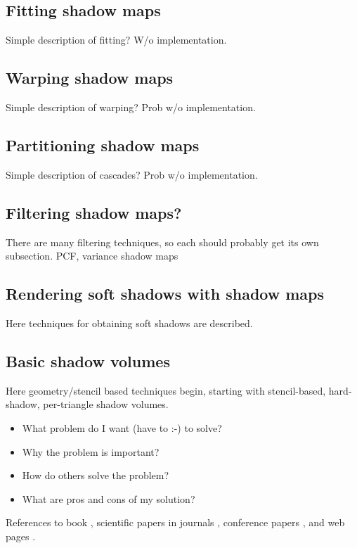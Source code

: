 \subsection{Fitting shadow maps}
Simple description of fitting? W/o implementation.

\subsection{Warping shadow maps}
Simple description of warping? Prob w/o implementation.

\subsection{Partitioning shadow maps}
Simple description of cascades? Prob w/o implementation.

\subsection{Filtering shadow maps?}
There are many filtering techniques, so each should probably get its own subsection. PCF, variance shadow maps

\subsection{Rendering soft shadows with shadow maps}
Here techniques for obtaining soft shadows are described.

\subsection{Basic shadow volumes}
Here geometry/stencil based techniques begin, starting with stencil-based, hard-shadow, per-triangle shadow volumes.


\begin{itemize}
\item What problem do I want (have to :-) to solve?
\item Why the problem is important?
\item How do others solve the problem?
\item What are pros and cons of my solution?
\end{itemize}

References to 
book \cite{bib:book},
scientific papers in journals \cite{bib:article},
conference papers \cite{bib:conference},
and web pages \cite{bib:internet}.

